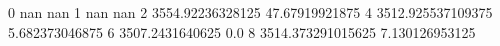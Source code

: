 0 nan nan
1 nan nan
2 3554.92236328125 47.67919921875
4 3512.925537109375 5.682373046875
6 3507.2431640625 0.0
8 3514.373291015625 7.130126953125
